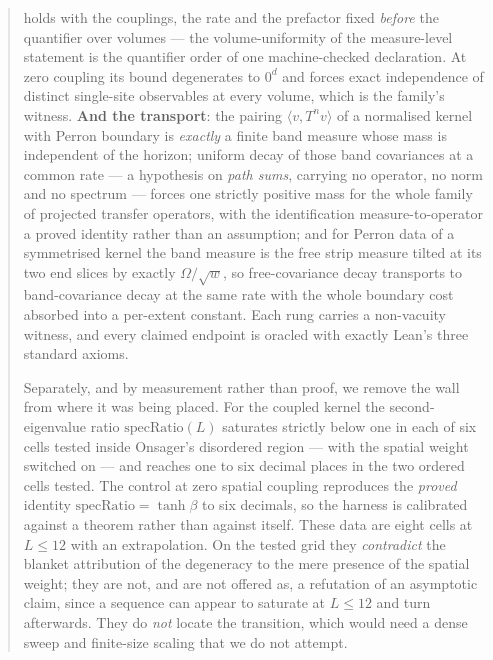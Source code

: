 \documentclass[11pt]{article}
\theoremstyle{definition}
\newcommand{\specRatio}{\mathrm{specRatio}}
\begin{document}
\begin{abstract}
holds with the couplings, the rate and the prefactor fixed \emph{before} the
quantifier over volumes --- the volume-uniformity of the measure-level
statement is the quantifier order of one machine-checked declaration.  At
zero coupling its bound degenerates to $0^{d}$ and forces exact independence
of distinct single-site observables at every volume, which is the family's
witness.
\textbf{And the transport}: the pairing $\langle v,T^nv\rangle$ of a
normalised kernel with Perron boundary is \emph{exactly} a finite band
measure whose mass is independent of the horizon; uniform decay of those
band covariances at a common rate --- a hypothesis on \emph{path sums},
carrying no operator, no norm and no spectrum --- forces one strictly
positive mass for the whole family of projected transfer operators, with
the identification measure-to-operator a proved identity rather than an
assumption; and for Perron data of a symmetrised kernel the band measure is
the free strip measure tilted at its two end slices by exactly
$\Omega/\sqrt{w}$, so free-covariance decay transports to band-covariance
decay at the same rate with the whole boundary cost absorbed into a
per-extent constant.
Each rung carries a non-vacuity witness, and every claimed endpoint is
oracled with exactly Lean's three standard axioms.

Separately, and by measurement rather than proof, we remove the wall from where
it was being placed.  For the coupled kernel the second-eigenvalue ratio
$\specRatio(L)$ saturates strictly below one in each of six cells tested inside
Onsager's disordered region --- with the spatial weight switched on --- and
reaches one to six decimal places in the two ordered cells tested.  The
control at zero spatial coupling reproduces the \emph{proved} identity
$\specRatio=\tanh\beta$ to six decimals, so the harness is calibrated against a
theorem rather than against itself.  These data are eight cells at $L\le12$ with
an extrapolation.  On the tested grid they \emph{contradict} the blanket
attribution of the degeneracy to the mere presence of the spatial weight; they
are not, and are not offered as, a refutation of an asymptotic claim, since a
sequence can appear to saturate at $L\le12$ and turn afterwards.  They do
\emph{not} locate the transition, which would need a dense sweep and
finite-size scaling that we do not attempt.


\end{abstract}
\end{document}

